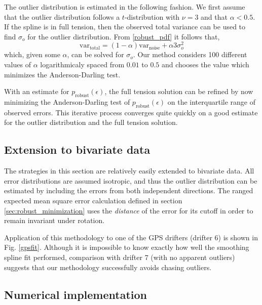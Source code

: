 \documentclass{ametsoc}
\begin{document}
The outlier distribution is estimated in the following fashion. We first assume that the outlier distribution follows a $t$-distribution with $\nu=3$ and that $\alpha<0.5$. If the spline is in full tension, then the observed total variance can be used to find $\sigma_o$ for the outlier distribution. From \eqref{robust_pdf} it follows that,
\begin{equation}
    \textrm{var}_\textrm{total} = (1-\alpha) \textrm{var}_\textrm{noise} + \alpha 3 \sigma_o^2
\end{equation}
which, given some $\alpha$, can be solved for $\sigma_o$. Our method considers 100 different values of $\alpha$ logarithmicaly spaced from $0.01$ to $0.5$ and chooses the value which minimizes the Anderson-Darling test.

With an estimate for $p_{\textrm{robust}}(\epsilon)$, the full tension solution can be refined by now minimizing the Anderson-Darling test of $p_{\textrm{robust}}(\epsilon)$ on the interquartile range of observed errors. This iterative process converges quite quickly on a good estimate for the outlier distribution and the full tension solution.

\subsection{Extension to bivariate data}
\label{sec:robust_bivariate}

The strategies in this section are relatively easily extended to bivariate data. All error distributions are assumed isotropic, and thus the outlier distribution can be estimated by including the errors from both independent directions. The ranged expected mean square error calculation defined in section \ref{sec:robust_minimization} uses the \emph{distance} of the error for its cutoff in order to remain invariant under rotation.

Application of this methodology to one of the GPS drifters (drifter 6) is shown in Fig. \ref{gpsfit}. Although it is impossible to know exactly how well the smoothing spline fit performed, comparison with drifter 7 (with no apparent outliers) suggests that our methodology successfully avoids chasing outliers.

\subsection{Numerical implementation}
\end{document}
